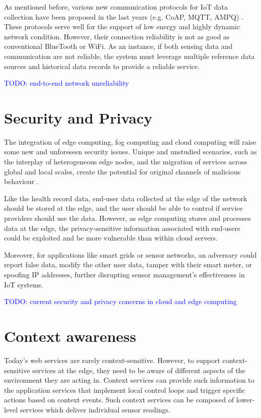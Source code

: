 As mentioned before, various new communication protocols for IoT data collection have been proposed in the last years (e.g. CoAP, MQTT, AMPQ) \cite{mqtt-coap-amqp-http}. These protocols serve well for the support of low energy and highly dynamic network condition. However, their connection reliability is not as good as conventional BlueTooth or WiFi. As an instance, if both sensing data and communication are not reliable, the system must leverage multiple reference data sources and historical data records to provide a reliable service.

\textcolor{blue}{TODO: end-to-end network unreliability}

\section{Security and Privacy}

The integration of edge computing, fog computing and cloud computing will raise some new and unforeseen security issues. Unique and unstudied scenarios, such as the interplay of heterogeneous edge nodes, and the migration of services across global and local scales, create the potential for original channels of malicious behaviour \cite{edge-computing-survey}.

Like the health record data, end-user data collected at the edge of the network should be stored at the edge, and the user should be able to control if service providers should use the data. However, as edge computing stores and processes data at the edge, the privacy-sensitive information associated with end-users could be exploited and be more vulnerable than within cloud servers.

Moreover, for applications like smart grids or sensor networks, an adversary could report false data, modify the other user data, tamper with their smart meter, or spoofing IP addresses, further disrupting sensor management's effectiveness in IoT systems.

\textcolor{blue}{TODO: current security and privacy concerns in cloud and edge computing}

\section{Context awareness}

Today's web services are rarely context-sensitive. However, to support context-sensitive services at the edge, they need to be aware of different aspects of the environment they are acting in. Context services can provide such information to the application services that implement local control loops and trigger specific actions based on context events. Such context services can be composed of lower-level services which deliver individual sensor readings.

